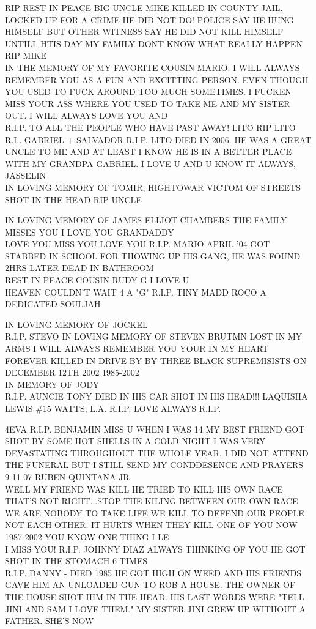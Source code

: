 \documentclass[10pt,letterpaper]{article}
\begin{document}
RIP REST IN PEACE BIG UNCLE MIKE KILLED IN COUNTY JAIL.  LOCKED UP FOR A CRIME HE DID NOT DO!  POLICE SAY HE HUNG HIMSELF BUT OTHER WITNESS SAY HE DID NOT KILL HIMSELF UNTILL HTIS DAY MY FAMILY DONT KNOW WHAT REALLY HAPPEN RIP MIKE\\
IN THE MEMORY OF MY FAVORITE COUSIN MARIO.  I WILL ALWAYS REMEMBER YOU AS A FUN AND EXCITTING PERSON.  EVEN THOUGH YOU USED TO FUCK AROUND TOO MUCH SOMETIMES.  I FUCKEN MISS YOUR ASS WHERE YOU USED TO TAKE ME AND MY SISTER OUT.  I WILL ALWAYS LOVE YOU AND\\
R.I.P. TO ALL THE PEOPLE WHO HAVE PAST AWAY!  LITO RIP LITO R.I.. GABRIEL + SALVADOR R.I.P. LITO DIED IN 2006.  HE WAS A GREAT UNCLE TO ME AND AT LEAST I KNOW HE IS IN A BETTER PLACE WITH MY GRANDPA GABRIEL.  I LOVE U AND U KNOW IT ALWAYS, JASSELIN\\
IN LOVING MEMORY OF TOMIR, HIGHTOWAR VICTOM OF STREETS SHOT IN THE HEAD RIP UNCLE

IN LOVING MEMORY OF JAMES ELLIOT CHAMBERS THE FAMILY MISSES YOU I LOVE YOU GRANDADDY\\
LOVE YOU MISS YOU LOVE YOU R.I.P. MARIO APRIL '04 GOT STABBED IN SCHOOL FOR THOWING UP HIS GANG, HE WAS FOUND 2HRS LATER DEAD IN BATHROOM\\
REST IN PEACE COUSIN RUDY G I LOVE U\\
HEAVEN COULDN'T WAIT 4 A "G" R.I.P. TINY MADD ROCO A DEDICATED SOULJAH

IN LOVING MEMORY OF JOCKEL\\
R.I.P. STEVO IN LOVING MEMORY OF STEVEN BRUTMN LOST IN MY ARMS I WILL ALWAYS REMEMBER YOU YOUR IN MY HEART FOREVER KILLED IN DRIVE{-}BY BY THREE BLACK SUPREMISISTS ON DECEMBER 12TH 2002 1985{-}2002\\
IN MEMORY OF JODY\\
R.I.P. AUNCIE TONY DIED IN HIS CAR SHOT IN HIS HEAD!!! LAQUISHA LEWIS \#15 WATTS, L.A. R.I.P. LOVE ALWAYS R.I.P.

4EVA R.I.P. BENJAMIN MISS U WHEN I WAS 14 MY BEST FRIEND GOT SHOT BY SOME HOT SHELLS IN A COLD NIGHT I WAS VERY DEVASTATING THROUGHOUT THE WHOLE YEAR.  I DID NOT ATTEND THE FUNERAL BUT I STILL SEND MY CONDDESENCE AND PRAYERS 9{-}11{-}07 RUBEN QUINTANA JR\\
WELL MY FRIEND WAS KILL HE TRIED TO KILL HIS OWN RACE THAT'S NOT RIGHT...STOP THE KILING BETWEEN OUR OWN RACE WE ARE NOBODY TO TAKE LIFE WE KILL TO DEFEND OUR PEOPLE NOT EACH OTHER.  IT HURTS WHEN THEY KILL ONE OF YOU NOW 1987{-}2002 YOU KNOW ONE THING I LE\\
I MISS YOU!  R.I.P. JOHNNY DIAZ ALWAYS THINKING OF YOU HE GOT SHOT IN THE STOMACH 6 TIMES\\
R.I.P. DANNY {-} DIED 1985 HE GOT HIGH ON WEED AND HIS FRIENDS GAVE HIM AN UNLOADED GUN TO ROB A HOUSE.  THE OWNER OF THE HOUSE SHOT HIM IN THE HEAD.  HIS LAST WORDS WERE "TELL JINI AND SAM I LOVE THEM."  MY SISTER JINI GREW UP WITHOUT A FATHER.  SHE'S NOW
\end{document}
